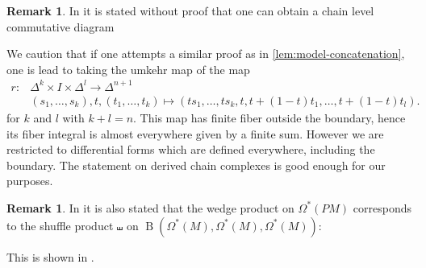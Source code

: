 \documentclass{scrartcl}
\theoremstyle{plain}
\theoremstyle{definition}
\newtheorem{remark}[theorem]{Remark}
\DeclareMathOperator{\BC}{B}
\begin{document}
\begin{remark}
    In \cite{naef2019string} it is stated without proof that one can obtain a chain level commutative diagram 
    \begin{center}
    \end{center}
    We caution that if one attempts a similar proof as in \cref{lem:model-concatenation}, one is lead to taking the umkehr map of the map 
    \begin{align*}
        r\colon &\Delta^k\times I\times\Delta^l\to \Delta^{n+1}\\
        &(s_1,\dots, s_k), t, (t_1,\dots, t_k)\mapsto (ts_1, \dots, ts_k, t, t+(1-t)t_1, \dots, t+(1-t)t_l).
    \end{align*}
    for $k$ and $l$ with $k+l=n$. This map has finite fiber outside the boundary, hence its fiber integral is almost everywhere given by a finite sum. However we are restricted to differential forms which are defined everywhere, including the boundary. The statement on derived chain complexes is good enough for our purposes. 
\end{remark}

\begin{remark}
    In \cite{naef2019string} it is also stated that the wedge product on $\Omega^*(PM)$ corresponds to the shuffle product $\shuffle$ on $\BC(\Omega^*(M), \Omega^*(M), \Omega^*(M))$:
    \begin{center}
    \end{center}
    This is shown in \cite[4.1]{chen1973iterated}.

\end{remark}
\end{document}
